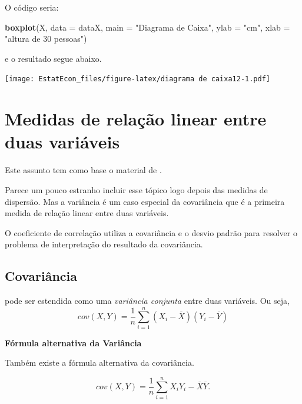 \documentclass[
]{book}
\newenvironment{Shaded}{\begin{snugshade}}{\end{snugshade}}
\newcommand{\DataTypeTok}[1]{\textcolor[rgb]{0.13,0.29,0.53}{#1}}
\newcommand{\KeywordTok}[1]{\textcolor[rgb]{0.13,0.29,0.53}{\textbf{#1}}}
\newcommand{\NormalTok}[1]{#1}
\newcommand{\StringTok}[1]{\textcolor[rgb]{0.31,0.60,0.02}{#1}}
\begin{document}
O código seria:

\begin{Shaded}
\begin{Highlighting}[]
\KeywordTok{boxplot}\NormalTok{(X, }\DataTypeTok{data =}\NormalTok{ dataX, }\DataTypeTok{main =} \StringTok{"Diagrama de Caixa"}\NormalTok{, }
    \DataTypeTok{ylab =} \StringTok{"cm"}\NormalTok{, }\DataTypeTok{xlab =} \StringTok{"altura de 30 pessoas"}\NormalTok{)}
\end{Highlighting}
\end{Shaded}

e o resultado segue abaixo.

\texttt{[image: EstatEcon\_files/figure-latex/diagrama de caixa12-1.pdf]}

\hypertarget{medidas-de-relauxe7uxe3o-linear-entre-duas-variuxe1veis}{%
\section{Medidas de relação linear entre duas variáveis}\label{medidas-de-relauxe7uxe3o-linear-entre-duas-variuxe1veis}}

Este assunto tem como base o material de \citet{Sartoris2013}.

Parece um pouco estranho incluir esse tópico logo depois das medidas de dispersão. Mas a variância é um caso especial da covariância que é a primeira medida de relação linear entre duas variáveis.

O coeficiente de correlação utiliza a covariância e o desvio padrão para resolver o problema de interpretação do resultado da covariância.

\hypertarget{covariuxe2ncia}{%
\subsection{Covariância}\label{covariuxe2ncia}}

pode ser estendida como uma \emph{variância conjunta} entre duas variáveis. Ou seja,
\begin{equation*}
  cov(X,Y) = \frac{1}{n}\sum_{i=1}^{n}(X_i - \overline{X})(Y_i - \overline{Y})
\end{equation*}

\textbf{Fórmula alternativa da Variância}

Também existe a fórmula alternativa da covariância.

\begin{equation*}
  cov(X,Y) = \frac{1}{n}\sum_{i=1}^{n}X_{i}Y_{i} - \overline{X}\overline{Y}.
\end{equation*}
\end{document}
